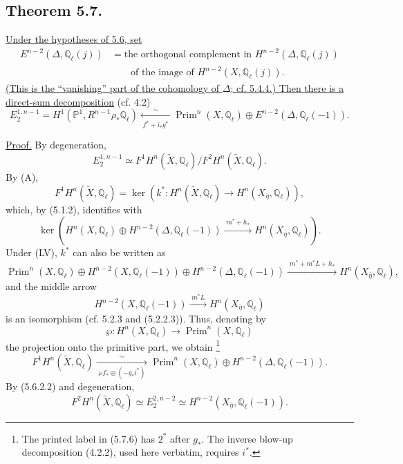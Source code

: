 \subsection*{Theorem 5.7.}
\underline{Under the hypotheses of 5.6, set}
\[
\begin{aligned}
E^{n-2}(\Delta,\mathbb Q_\ell(j))
&=\underline{\text{the orthogonal complement in }}
H^{n-2}(\Delta,\mathbb Q_\ell(j))\\
&\qquad\underline{\text{of the image of }}
H^{n-2}(X,\mathbb Q_\ell(j)).
\end{aligned}
\]
\underline{(This is the \textquotedblleft vanishing\textquotedblright{}
part of the cohomology of $\Delta$; cf. 5.4.4.)  Then there is a
direct-sum decomposition} (cf. 4.2)
\begin{equation}\tag{5.7.1}
E_2^{1,n-1}
=H^1(\mathbb P^1,R^{n-1}\rho_*\mathbb Q_\ell)
\xleftarrow[\;f^*+i_*g^*\;]{\sim}
\operatorname{Prim}^n(X,\mathbb Q_\ell)
\oplus E^{n-2}(\Delta,\mathbb Q_\ell(-1)).
\end{equation}

\underline{Proof.}
By degeneration,
\[
E_2^{1,n-1}\simeq
F^1H^n(\widetilde X,\mathbb Q_\ell)
\big/F^2H^n(\widetilde X,\mathbb Q_\ell).
\]
By (A),
\begin{equation}\tag{5.7.2}
F^1H^n(\widetilde X,\mathbb Q_\ell)
=\ker\!\left(
k^*:H^n(\widetilde X,\mathbb Q_\ell)\longrightarrow
H^n(X_{\bar\eta},\mathbb Q_\ell)
\right),
\end{equation}
which, by (5.1.2), identifies with
\[
\ker\!\left(
H^n(X,\mathbb Q_\ell)
\oplus H^{n-2}(\Delta,\mathbb Q_\ell(-1))
\xrightarrow{\;m^*+h_*\;}
H^n(X_{\bar\eta},\mathbb Q_\ell)
\right).
\]
Under (LV), $k^*$ can also be written as
\begin{equation}\tag{5.7.3}
\operatorname{Prim}^n(X,\mathbb Q_\ell)
\oplus H^{n-2}(X,\mathbb Q_\ell(-1))
\oplus H^{n-2}(\Delta,\mathbb Q_\ell(-1))
\xrightarrow{\;m^*+m^*L+h_*\;}
H^n(X_{\bar\eta},\mathbb Q_\ell),
\end{equation}
and the middle arrow
\begin{equation}\tag{5.7.4}
H^{n-2}(X,\mathbb Q_\ell(-1))
\xrightarrow{\;m^*L\;}
H^n(X_{\bar\eta},\mathbb Q_\ell)
\end{equation}
is an isomorphism (cf. 5.2.3 and (5.2.2.3)).  Thus, denoting by
\begin{equation}\tag{5.7.5}
\wp:H^n(X,\mathbb Q_\ell)\longrightarrow
\operatorname{Prim}^n(X,\mathbb Q_\ell)
\end{equation}
the projection onto the primitive part, we obtain
\footnote{The printed label in (5.7.6) has $2^*$ after $g_*$.
The inverse blow-up decomposition (4.2.2), used here verbatim, requires
$i^*$.}
\begin{equation}\tag{5.7.6}
F^1H^n(\widetilde X,\mathbb Q_\ell)
\xrightarrow[\;\wp f_*\oplus(-g_*i^*)\;]{\sim}
\operatorname{Prim}^n(X,\mathbb Q_\ell)
\oplus H^{n-2}(\Delta,\mathbb Q_\ell(-1)).
\end{equation}
By (5.6.2.2) and degeneration,
\begin{equation}\tag{5.7.7}
F^2H^n(\widetilde X,\mathbb Q_\ell)
\simeq E_2^{2,n-2}
\simeq H^{n-2}(X_{\bar\eta},\mathbb Q_\ell(-1)).
\end{equation}

